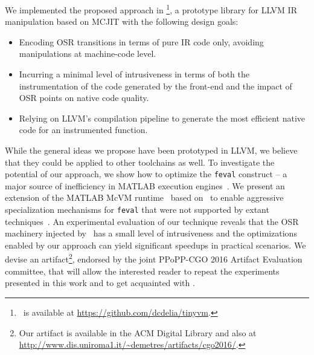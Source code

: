 \noindent We implemented the proposed approach in \osrkit\footnote{\osrkit\ is available at \url{https://github.com/dcdelia/tinyvm}.}, a prototype library for LLVM IR manipulation based on MCJIT with the following design goals:
\begin{itemize}
\item Encoding OSR transitions in terms of pure IR code only, avoiding manipulations at machine-code level.
\item Incurring a minimal level of intrusiveness in terms of both the instrumentation of the code generated by the front-end and the impact of OSR points on native code quality.
\item Relying on LLVM's compilation pipeline to generate the most efficient native code for an instrumented function.
\end{itemize}


\noindent While the general ideas we propose have been prototyped in LLVM, we believe that they could be applied to other toolchains as well. To investigate the potential of our approach, we show how to optimize the {\tt feval} construct -- a major source of inefficiency in MATLAB execution engines~\cite{lameed2013feval, radpour2013refactoring}. We present an extension of the MATLAB McVM runtime~\cite{chevalier2010mcvm} based on \osrkit\ to enable aggressive specialization mechanisms for {\tt feval} that were not supported by extant techniques~\cite{lameed2013feval}. An experimental evaluation of our technique reveals that the OSR machinery injected by \osrkit\ has a small level of intrusiveness and the optimizations enabled by our approach can yield significant speedups in practical scenarios. We devise an artifact\footnote{Our artifact is available in the ACM Digital Library and also at\\ \url{http://www.dis.uniroma1.it/~demetres/artifacts/cgo2016/}.}, endorsed by the joint PPoPP-CGO 2016 Artifact Evaluation committee, that will allow the interested reader to repeat the experiments presented in this work and to get acquainted with \osrkit.

